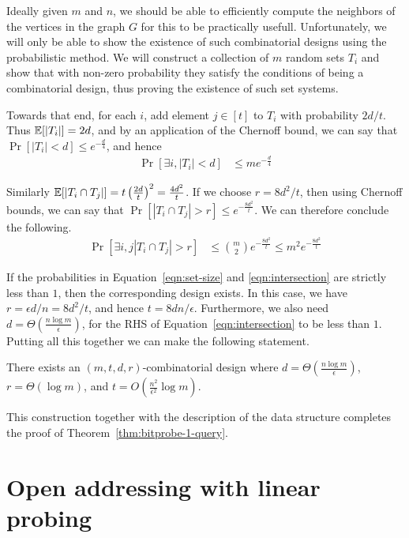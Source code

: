 Ideally given $m$ and $n$, we should be able to efficiently compute the
neighbors of the vertices in the graph $G$ for this to be practically
usefull. Unfortunately, we will only be able to show the existence of such
combinatorial designs using the probabilistic method. We will construct a
collection of $m$ random sets $T_i$ and show that with non-zero probability they
satisfy the conditions of being a combinatorial design, thus proving the
existence of such set systems.

Towards that end, for each $i$, add element $j\in [t]$ to $T_i$ with probability
$2d/t$. Thus $\mathbb{E}[|T_i|] = 2d$, and by an application of the Chernoff bound, we
can say that $\Pr\left[|T_i| < d \right] \leq e^{-\frac{d}{4}}$, and hence
\begin{align}
  \Pr\left[ \exists i, |T_i| < d \right] &\leq m e^{-\frac{d}{4}}
  \label{eqn:set-size}                                         
\end{align}

Similarly $\mathbb{E}[|T_i \cap T_j|] = t\left(\frac{2d}{t}\right)^2 =
\frac{4d^2}{t}$. If we choose $r = 8d^2/t$, then using Chernoff bounds, we can
say that $\Pr[|T_i \cap T_j| > r] \leq e^{-\frac{8d^2}{t}}$. We can therefore
conclude the following.
\begin{align}
  \Pr[ \exists i,j |T_i \cap T_j| > r] &\leq \binom{m}{2} e^{-\frac{8d^2}{t}} \leq m^2 e^{-\frac{8d^2}{t}}
  \label{eqn:intersection}
\end{align}

If the probabilities in Equation~\ref{eqn:set-size} and \ref{eqn:intersection}
are strictly less than $1$, then the corresponding design exists. In this case,
we have $r = \epsilon d/n = 8d^2 /t$, and hence $t = 8dn/\epsilon$. Furthermore,
we also need $d = \Theta\left(\frac{n\log m}{\epsilon} \right)$, for the RHS of
Equation~\ref{eqn:intersection} to be less than $1$. Putting all this together
we can make the following statement.
\begin{lemma}
  There exists an $(m,t,d,r)$-combinatorial design where
  $d = \Theta\left(\frac{n\log m}{\epsilon} \right)$, $r = \Theta(\log m)$, and
  $t = O\left(\frac{n^2}{\epsilon^2} \log m \right)$.
\end{lemma}

This construction together with the description of the data structure completes
the proof of Theorem~\ref{thm:bitprobe-1-query}.

\section{Open addressing with linear probing}

